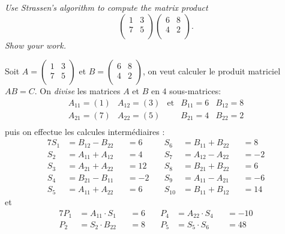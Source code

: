 \begin{description}
   {\itshape Use Strassen’s algorithm to compute the matrix product \[\begin{pmatrix}
      1 & 3\\
      7 & 5\\
    \end{pmatrix}
    \begin{pmatrix}
      6 & 8\\
      4 & 2\\
    \end{pmatrix}.\] 
  Show your work.}

    \begin{ex}
      Soit $A = \begin{pmatrix}
      1 & 3\\
      7 & 5\\   
    \end{pmatrix} $ et $ B = \begin{pmatrix}
      6 & 8\\
      4 & 2\\
    \end{pmatrix}$, on veut calculer le produit matriciel $AB=C$.
    On {\it divise} les matrices $A$ et $B$ en $4$ sous-matrices: \[\begin{array}{ccccc}
      A_{11} = (1) & A_{12} = (3) & \text{et} & B_{11} = 6& B_{12} = 8\\
      A_{21} = (7) & A_{22} = (5) &&B_{21} = 4& B_{22} = 2\\
    \end{array}
    \] puis on effectue les calcules interm\'ediaires :
    \begin{alignat*}{7}
    S_1 &= B_{12} - B_{22} &&= 6 &\quad S_6&=B_{11} + B_{22}&&= 8\\
    S_2 &= A_{11} + A_{12} &&= 4 &\quad S_7&=A_{12} - A_{22}&&=-2\\
    S_3 &= A_{21} + A_{22} &&= 12 &\quad S_8&=B_{21}+ B_{22} &&=6\\
    S_4 &= B_{21} - B_{11} &&= -2&\quad S_9&=A_{11}-A_{21}&&=-6\\
    S_5 &= A_{11} + A_{22} &&= 6 &\quad S_{10}&=B_{11}+B_{12}&&=14
    \end{alignat*} et
    \begin{alignat*}{7}
      P_1 &= A_{11}\cdot S_1 &&= 6 &\quad P_4 &= A_{22}\cdot S_4 &&=  -10\\
      P_2 &= S_2\cdot B_{22} &&= 8 &\quad P_5 &= S_5\cdot S_6 &&= 48\\

\end{alignat*}
\end{ex}
\end{description}
